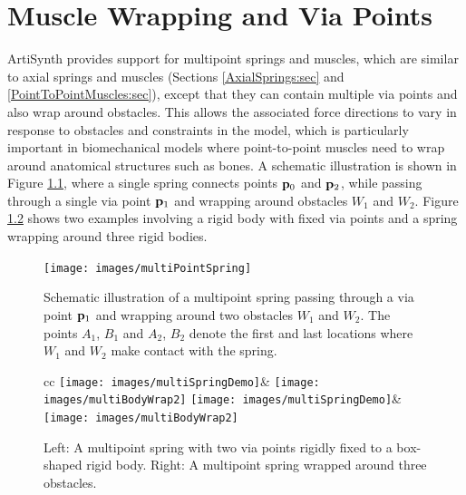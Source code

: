 \ifdefined\maindoc\else
\def\doctitle{Muscle Wrapping and Via Points}

\mainmatter
\fi

\chapter{Muscle Wrapping and Via Points}
\label{multipointSpringIntro:sec}

ArtiSynth provides support for multipoint springs and muscles, which
are similar to axial springs and muscles (Sections
\ref{AxialSprings:sec} and \ref{PointToPointMuscles:sec}), except that
they can contain multiple via points and also wrap around obstacles.
This allows the associated force directions to vary in response to
obstacles and constraints in the model, which is particularly
important in biomechanical models where point-to-point muscles need to
wrap around anatomical structures such as bones.  A schematic
illustration is shown in Figure \ref{multiPointSpring:fig}, where a
single spring connects points ${\bf p}_0$ and ${\bf p}_2$, while passing through
a single via point ${\bf p}_1$ and wrapping around obstacles $W_1$ and
$W_2$. Figure \ref{multiSpringExamples:fig} shows two examples
involving a rigid body with fixed via points and a spring wrapping
around three rigid bodies.

\begin{figure}[ht]
\begin{center}
 \texttt{[image: images/multiPointSpring]}
\end{center}
\caption{Schematic illustration of a multipoint spring passing through
a via point ${\bf p}_1$ and wrapping around two obstacles $W_1$ and
$W_2$. The points $A_1$, $B_1$ and $A_2$, $B_2$ denote the first and
last locations where $W_1$ and $W_2$ make contact with the spring.}
\label{multiPointSpring:fig}
\end{figure}

\begin{figure}[ht]
\begin{center}
  \begin{tabular}{cc}
    \iflatexml
       \texttt{[image: images/multiSpringDemo]}&
       \texttt{[image: images/multiBodyWrap2]}
    \else
       \texttt{[image: images/multiSpringDemo]}&
       \texttt{[image: images/multiBodyWrap2]}
    \fi
  \end{tabular}
\end{center}
\caption{Left: A multipoint spring with two via points rigidly fixed
to a box-shaped rigid body. Right: A multipoint spring wrapped around
three obstacles.}
\label{multiSpringExamples:fig}
\end{figure}

